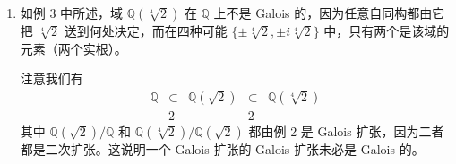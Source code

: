 \begin{enumerate}[label=(\arabic*)]
和前面的例子一样，我们可以确定 Galois 群任意子群的固定域。例如，考虑由 $\sigma$ 生成的子群 $\{1,\sigma,\sigma^2\}$ 的固定域。它们正是被 $\sigma$ 固定的元素（见等式 (14.1) 中的显式公式），因为如果一个元素被 $\sigma$ 固定，那么也被 $\sigma^2$ 固定。（一般地，某个子群的固定域就是被该子群的一组生成元固定的域。）被 $\sigma$ 固定的元素是满足
\[
a=a,\\qquad b=-e,
\qquad c=f-c,
\qquad d=d,
\qquad e=b-e,
\qquad f=-c
\]
的元素，这等价于 $b=c=f=e=0$。因此 $\{1,\sigma,\sigma^2\}$ 的固定域是 $\mathbb Q(\rho)$。

\paragraph{注记：} 这个例子说明，在由生成元的作用确定 Galois 群时必须谨慎。如上所述，并不是每个把 $\sqrt[3]{2}$ 和 $\rho\sqrt[3]{2}$ 送到 $x^3-2$ 的根的映射，都产生域的自同构（例如，映射
\[
\sqrt[3]{2}\mapsto \rho\sqrt[3]{2},\qquad
\rho\sqrt[3]{2}\mapsto \rho\sqrt[3]{2}
\]
显然不可能是自同构，因为它显然不是单射）。关键在于生成元之间可能存在（有时非常微妙的）代数关系，而这些关系必须被自同构保持。例如，这里的两个生成元之商是 $\rho$，它在上面的映射下被送到 $1$，而不是 $\rho$ 的极小多项式的根。换句话说，这些生成元之商满足一个二次方程，而该映射不保持这一性质。

另一个（不那么平凡的）例子，可与第 2 节中关于 $x^8-2$ 的分裂域的讨论比较。

\item 如例 3 中所述，域 $\mathbb Q(\sqrt[4]{2})$ 在 $\mathbb Q$ 上不是 Galois 的，因为任意自同构都由它把 $\sqrt[4]{2}$ 送到何处决定，而在四种可能 $\{\pm\sqrt[4]{2},\pm i\sqrt[4]{2}\}$ 中，只有两个是该域的元素（两个实根）。

注意我们有
\[
\begin{array}{ccccc}
\mathbb Q & \subset & \mathbb Q(\sqrt2) & \subset & \mathbb Q(\sqrt[4]{2})\\
& 2 && 2 &
\end{array}
\]
其中 $\mathbb Q(\sqrt2)/\mathbb Q$ 和 $\mathbb Q(\sqrt[4]{2})/\mathbb Q(\sqrt2)$ 都由例 2 是 Galois 扩张，因为二者都是二次扩张。这说明一个 Galois 扩张的 Galois 扩张未必是 Galois 的。


\end{enumerate}
